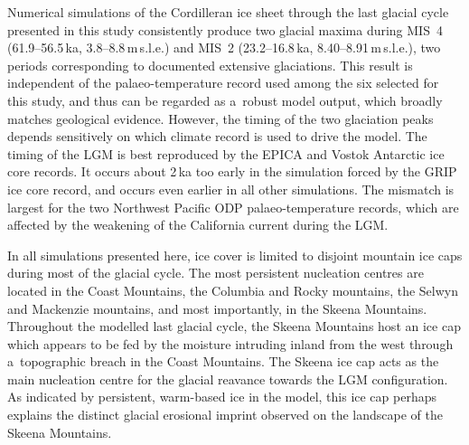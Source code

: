 \documentclass[tc, manuscript]{copernicus}
\begin{document}
\conclusions
\label{sec:concl}

      Numerical simulations of the Cordilleran ice sheet through the last
      glacial cycle presented in this study consistently produce two glacial
      maxima during MIS~4 (61.9--56.5\,\unit{ka},
      3.8--8.8\,\unit{m}\,s.l.e.) and MIS~2 (23.2--16.8\,\unit{ka},
      8.40--8.91\,\unit{m}\,s.l.e.), two periods corresponding to documented
      extensive glaciations. This result is independent of the
      palaeo-temperature record used among the six selected for this study,
      and thus can be regarded as a~robust model output, which broadly
      matches geological evidence. However, the timing of the two glaciation
      peaks depends sensitively on which climate record is used to drive the
      model. The timing of the LGM is best reproduced by the EPICA and
      Vostok Antarctic ice core records. It occurs about 2\,\unit{ka} too
      early in the simulation forced by the GRIP ice core record, and occurs
      even earlier in all other simulations. The mismatch is largest for the
      two Northwest Pacific ODP palaeo-temperature records, which are
      affected by the weakening of the California current during the LGM.

      In all simulations presented here, ice cover is limited to disjoint
      mountain ice caps during most of the glacial cycle. The most
      persistent nucleation centres are located in the Coast Mountains, the
      Columbia and Rocky mountains, the Selwyn and Mackenzie mountains, and
      most importantly, in the Skeena Mountains. Throughout the modelled
      last glacial cycle, the Skeena Mountains host an ice cap which appears
      to be fed by the moisture intruding inland from the west through
      a~topographic breach in the Coast Mountains. The Skeena ice cap acts
      as the main nucleation centre for the glacial reavance towards the LGM
      configuration. As indicated by persistent, warm-based ice in the
      model, this ice cap perhaps explains the distinct glacial erosional
      imprint observed on the landscape of the Skeena Mountains.
\end{document}
